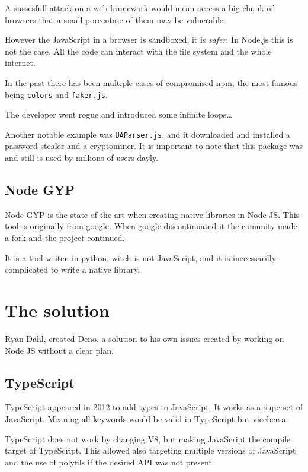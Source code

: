 \documentclass[12pt, letterpaper]{article}
\begin{document}
\begin{multicols}{2}
    A sussesfull attack on a web framework would mean access a big chunk of browsers that a small porcentaje of them may be vulnerable.

    However the JavaScript in a browser is sandboxed, it is \textit{safer}. In Node.js this is not the case. All the code can interact with the file system and the whole internet.

    In the past there has been multiple cases of compromised npm, the most famous being \verb|colors| and \verb|faker.js|.

    The developer went rogue and introduced some infinite loops\dots

    Another notable example was \verb|UAParser.js|, and it downloaded and installed a password stealer and a cryptominer. It is important to note that this package was and still is used by millions of users dayly.


    \subsection{Node GYP}

    Node GYP is the state of the art when creating native libraries in Node JS. This tool is originally from google. When google discontinuated it the comunity made a fork and the project continued.

    It is a tool writen in python, witch is not JavaScript, and it is inecessarilly complicated to write a native library.

    \section{The solution}

    Ryan Dahl, created Deno, a solution to his own issues created by working on Node JS without a clear plan.

    \subsection{TypeScript}

    TypeScript appeared in 2012 to add types to JavaScript. It works as a superset of JavaScript. Meaning all keywords would be valid in TypeScript but vicebersa.

    TypeScript does not work by changing V8, but making JavaScript the compile target of TypeScript. This allowed also targeting multiple versions of JavaScript and the use of polyfils if the desired API was not present.


\end{multicols}
\end{document}
